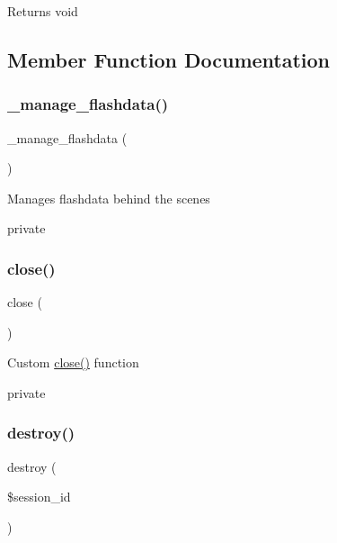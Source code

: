 \begin{DoxyReturn}{Returns}
void 
\end{DoxyReturn}


\subsection{Member Function Documentation}
\mbox{\label{class_zebra___session_af8de5d6fbd0151839a15e38fffaf9897}} 
\subsubsection{\texorpdfstring{\+\_\+manage\+\_\+flashdata()}{\_manage\_flashdata()}}
{\footnotesize\ttfamily \+\_\+manage\+\_\+flashdata (\begin{DoxyParamCaption}{ }\end{DoxyParamCaption})}

Manages flashdata behind the scenes

private \mbox{\label{class_zebra___session_aa69c8bf1f1dcf4e72552efff1fe3e87e}} 
\subsubsection{\texorpdfstring{close()}{close()}}
{\footnotesize\ttfamily close (\begin{DoxyParamCaption}{ }\end{DoxyParamCaption})}

Custom \mbox{\hyperlink{class_zebra___session_aa69c8bf1f1dcf4e72552efff1fe3e87e}{close()}} function

private \mbox{\label{class_zebra___session_aaec5812f6b4eb6835f88d3baa06a002a}} 
\subsubsection{\texorpdfstring{destroy()}{destroy()}}
{\footnotesize\ttfamily destroy (\begin{DoxyParamCaption}\item[{}]{\$session\+\_\+id }\end{DoxyParamCaption})}


